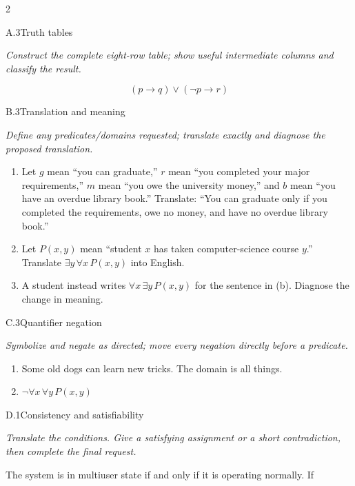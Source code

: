 \documentclass[9pt]{extarticle}
\begin{document}
\CoreWorkArea
\FormBreak
{}
\begin{multicols}{2}
\begin{CoreProblem}{A.3}{Truth tables}
{\scriptsize\textit{Construct the complete eight-row table; show useful intermediate columns and classify the result.}\par}
\[
  (p\to q)\lor(\neg p\to r)
\]
\end{CoreProblem}
\begin{CoreProblem}{B.3}{Translation and meaning}
{\scriptsize\textit{Define any predicates/domains requested; translate exactly and diagnose the proposed translation.}\par}
\begin{enumerate}[label=(\alph*)]
  \item Let $g$ mean ``you can graduate,'' $r$ mean ``you completed your major
        requirements,'' $m$ mean ``you owe the university money,'' and $b$
        mean ``you have an overdue library book.'' Translate: ``You can
        graduate only if you completed the requirements, owe no money, and
        have no overdue library book.''
  \item Let $P(x,y)$ mean ``student $x$ has taken computer-science course
        $y$.'' Translate $\exists y\,\forall x\,P(x,y)$ into English.
  \item A student instead writes $\forall x\,\exists y\,P(x,y)$ for the
        sentence in (b). Diagnose the change in meaning.
\end{enumerate}
\end{CoreProblem}
\begin{CoreProblem}{C.3}{Quantifier negation}
{\scriptsize\textit{Symbolize and negate as directed; move every negation directly before a predicate.}\par}
\begin{enumerate}[label=(\alph*)]
  \item Some old dogs can learn new tricks. The domain is all things.
  \item $\neg\forall x\,\forall y\,P(x,y)$
\end{enumerate}
\end{CoreProblem}
\columnbreak
\begin{CoreProblem}{D.1}{Consistency and satisfiability}
{\scriptsize\textit{Translate the conditions. Give a satisfying assignment or a short contradiction, then complete the final request.}\par}
The system is in multiuser state if and only if it is operating normally. If

\end{CoreProblem}
\end{multicols}
\end{document}
